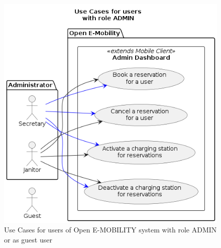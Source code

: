 \begin{figure}[h!]
    \centering
    \includegraphics[scale=0.4]{thesis/sections/images/main/2_chapter/uc_admin_users.png}
    \caption{Use Cases for users of Open E-MOBILITY system with role ADMIN or as guest user}
    \label{fig:uc_admin_users}
\end{figure}

